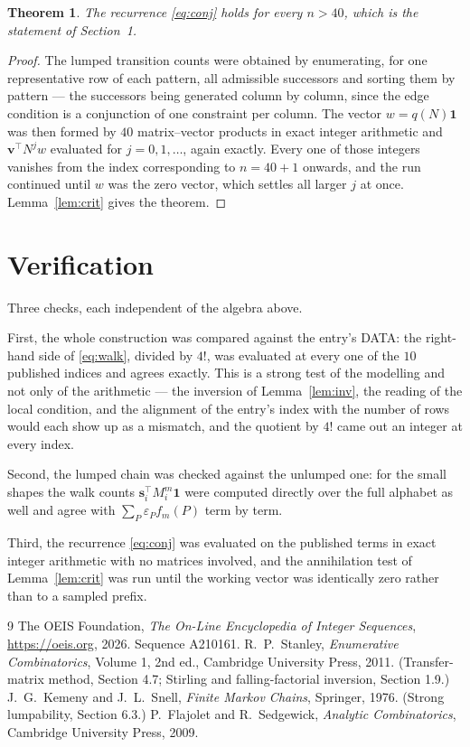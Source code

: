 \documentclass[11pt,a4paper]{article}
\theoremstyle{plain}
\newtheorem{theorem}{Theorem}
\theoremstyle{definition}
\begin{document}
\begin{theorem}
The recurrence \eqref{eq:conj} holds for every $n>40$, which is the statement of
Section~1.
\end{theorem}

\begin{proof}
The lumped transition counts were obtained by enumerating, for one representative row of
each pattern, all admissible successors and sorting them by pattern --- the successors being
generated column by column, since the edge condition is a conjunction of one constraint per
column. The vector $w=q(N)\mathbf{1}$ was then formed by $40$ matrix--vector products
in exact integer arithmetic and $\mathbf{v}^{\!\top}N^{j}w$ evaluated for
$j=0,1,\dots$, again exactly. Every one of those integers vanishes from the index
corresponding to $n=40+1$ onwards, and the run continued until $w$ was the zero vector,
which settles all larger $j$ at once. Lemma~\ref{lem:crit} gives the theorem.
\end{proof}

\section{Verification}

Three checks, each independent of the algebra above.

First, the whole construction was compared against the entry's DATA: the right-hand side of
\eqref{eq:walk}, divided by $4!$, was evaluated at every one of the $10$
published indices and agrees exactly. This is a strong test of the modelling and not only of
the arithmetic --- the inversion of Lemma~\ref{lem:inv}, the reading of the local
condition, and the alignment of the entry's index with the number of rows would each
show up as a mismatch, and the quotient by $4!$ came out an integer at every index.

Second, the lumped chain was checked against the unlumped one: for the small shapes the walk
counts $\mathbf{s}_i^{\!\top}M_i^{m}\mathbf{1}$ were computed directly over the full
alphabet as well and agree with $\sum_P\varepsilon_Pf_m(P)$ term by term.

Third, the recurrence \eqref{eq:conj} was evaluated on the published terms in exact integer
arithmetic with no matrices involved, and the annihilation test of Lemma~\ref{lem:crit} was
run until the working vector was identically zero rather than to a sampled prefix.

\begin{thebibliography}{9}
 The OEIS Foundation, \emph{The On-Line Encyclopedia of Integer
Sequences}, \url{https://oeis.org}, 2026. Sequence A210161.
 R.~P.~Stanley, \emph{Enumerative Combinatorics}, Volume 1, 2nd ed.,
Cambridge University Press, 2011. (Transfer-matrix method, Section 4.7; Stirling and
falling-factorial inversion, Section 1.9.)
 J.~G.~Kemeny and J.~L.~Snell, \emph{Finite Markov Chains}, Springer,
1976. (Strong lumpability, Section 6.3.)
 P.~Flajolet and R.~Sedgewick, \emph{Analytic Combinatorics}, Cambridge
University Press, 2009.
\end{thebibliography}
\end{document}
